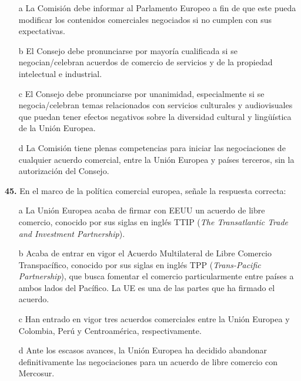 \documentclass{nuevotema}
\begin{document}
\begin{itemize}
	\item[a] La Comisión debe informar al Parlamento Europeo a fin de que este pueda modificar los contenidos comerciales negociados si no cumplen con sus expectativas.
	\item[b] El Consejo debe pronunciarse por mayoría cualificada si se negocian/celebran acuerdos de comercio de servicios y de la propiedad intelectual e industrial.
	\item[c] El Consejo debe pronunciarse por unanimidad, especialmente si se negocia/celebran temas relacionados con servicios culturales y audiovisuales que puedan tener efectos negativos sobre la diversidad cultural y lingüística de la Unión Europea. 
	\item[d] La Comisión tiene plenas competencias para iniciar las negociaciones de cualquier acuerdo comercial, entre la Unión Europea y países terceros, sin la autorización del Consejo.
\end{itemize}

\textbf{45.} En el marco de la política comercial europea, señale la respuesta correcta:
\begin{itemize}
	\item[a] La Unión Europea acaba de firmar con EEUU un acuerdo de libre comercio, conocido por sus siglas en inglés TTIP (\textit{The Transatlantic Trade and Investment Partnership}).
	\item[b] Acaba de entrar en vigor el Acuerdo Multilateral de Libre Comercio Transpacífico, conocido por sus siglas en inglés TPP (\textit{Trans-Pacific Partnership}), que busca fomentar el comercio particularmente entre países a ambos lados del Pacífico. La UE es una de las partes que ha firmado el acuerdo.
	\item[c] Han entrado en vigor tres acuerdos comerciales entre la Unión Europea y Colombia, Perú y Centroamérica, respectivamente.
	\item[d] Ante los escasos avances, la Unión Europea ha decidido abandonar definitivamente las negociaciones para un acuerdo de libre comercio con Mercosur.
\end{itemize}
\end{document}
